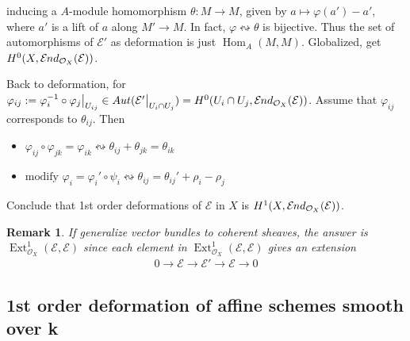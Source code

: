 \documentclass{ctexart}
\newtheorem{remark}{Remark}[section]
\renewcommand{\hom}{\operatorname{Hom}}
\newcommand{\ext}{\operatorname{Ext}}
\newcommand{\sheafend}{\mathcal{E}\kern -.5pt nd}
\begin{document}
inducing a $A$-module homomorphism $\theta: M \rightarrow M$, given by $a \mapsto \varphi(a') - a'$, 
where $a'$ is a lift of $a$ along $M' \rightarrow M$.
In fact, $\varphi \leftrightsquigarrow \theta$ is bijective.
Thus the set of automorphisms of $\mathcal{E}'$ as deformation is just $\hom_{A}(M, M)$.
Globalized, get $H^{0}(X, \sheafend_{\mathcal{O}_{X}}(\mathcal{E}))$.
\par
Back to deformation, for $\varphi_{ij} := \varphi_{i}^{-1} \circ \varphi_{j}\big{|}_{U_{ij}}\in Aut(\mathcal{E}'\big{|}_{U_{i} \cap U_{j}}) = H^{0}(U_{i} \cap U_{j}, \sheafend_{\mathcal{O}_{X}}(\mathcal{E}))$.
Assume that $\varphi_{ij}$ corresponds to $\theta_{ij}$.
Then 
\begin{itemize}
    \item $\varphi_{ij} \circ \varphi_{jk} = \varphi_{ik} \leftrightsquigarrow \theta_{ij} + \theta_{jk} = \theta_{ik}$
    \item $\text{modify } \varphi_{i} = \varphi_{i}' \circ \psi_{i} \leftrightsquigarrow \theta_{ij} = \theta_{ij}' + \rho_{i} - \rho_{j}$
\end{itemize}
Conclude that 1st order deformations of $\mathcal{E}$ in $X$ is $H^{1}(X, \sheafend_{\mathcal{O}_{X}}(\mathcal{E}))$.
\begin{remark}
    If generalize vector bundles to coherent sheaves, the answer is $\ext_{\mathcal{O}_{X}}^{1}(\mathcal{E}, \mathcal{E})$ since each element in $\ext_{\mathcal{O}_{X}}^{1}(\mathcal{E}, \mathcal{E})$ gives an extension
    \begin{eqnarray}
        0 \longrightarrow \mathcal{E} \longrightarrow \mathcal{E}' \longrightarrow \mathcal{E} \longrightarrow 0
    \end{eqnarray}
\end{remark}

\subsection{1st order deformation of affine schemes smooth over k}
\label{subsection:Deformation_Theory_1st_order_deformation_of_affine_schemes_smooth__k}
\end{document}
